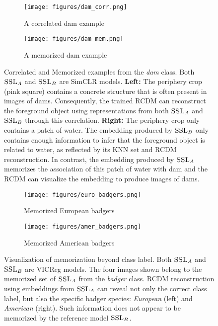 \begin{figure*}[t!]
     \centering
     \begin{subfigure}[b]{0.49\textwidth}
         \centering
         \texttt{[image: figures/dam\_corr.png]}
         \caption{A {\color{part_blue}correlated} dam example}
         \label{fig:dam correlated}
     \end{subfigure}
     \hfill
     \begin{subfigure}[b]{0.49\textwidth}
         \centering
         \texttt{[image: figures/dam\_mem.png]}
         \caption{A {\color{part_orange}memorized} dam example}
         \label{fig:dam memorized}
     \end{subfigure}
\caption[Correlated and Memorized examples from the \emph{dam} class.]{
Correlated and Memorized examples from the \emph{dam} class. Both $\textsc{SSL}_A$ and $\textsc{SSL}_B$ are SimCLR models.
\textbf{Left:} The periphery crop (pink square) contains a concrete structure that is often present in images of dams. Consequently, the trained RCDM can reconstruct the foreground object using representations from both $\textsc{SSL}_A$ and $\textsc{SSL}_B$ through this correlation.
\textbf{Right:} The periphery crop only contains a patch of water. The embedding produced by $\textsc{SSL}_B$ only contains enough information to infer that the foreground object is related to water, as reflected by its KNN set and RCDM reconstruction. In contrast, the embedding produced by $\textsc{SSL}_A$ memorizes the association of this patch of water with dam and the RCDM can visualize the embedding to produce images of dams.
}
\label{fig:mem v corr dam}
\end{figure*}


\begin{figure}[t!]
     \centering
     \begin{subfigure}[b]{0.49\textwidth}
         \centering
         \texttt{[image: figures/euro\_badgers.png]}
         \caption{{\color{part_orange}Memorized} European badgers}
         \label{fig:euro badgers}
     \end{subfigure}
     \hfill
     \begin{subfigure}[b]{0.49\textwidth}
         \centering
         \texttt{[image: figures/amer\_badgers.png]}
         \caption{{\color{part_orange}Memorized} American badgers}
         \label{fig:amer badgers}
     \end{subfigure}
\caption[Visualization of \dejavu memorization beyond class label.]{
Visualization of \dejavu memorization beyond class label. Both $\textsc{SSL}_A$ and $\textsc{SSL}_B$ are VICReg models. 
The four images shown belong to the memorized set of $\textsc{SSL}_A$ from the \emph{badger} class. RCDM reconstruction using embeddings from $\textsc{SSL}_A$ can reveal not only the correct class label, but also the specific badger species: \emph{European} (left) and \emph{American} (right). Such information does not appear to be memorized by the reference model $\textsc{SSL}_B$.
} 
\label{fig:in class badger}
\end{figure}


